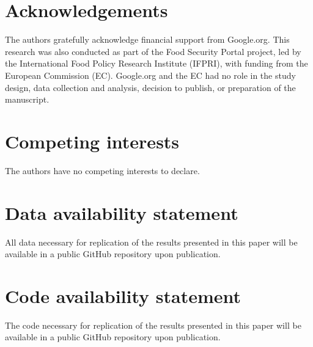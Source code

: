 \documentclass[pdflatex,sn-mathphys-num]{sn-jnl}%
\theoremstyle{thmstyleone}%
\theoremstyle{thmstyletwo}%
\theoremstyle{thmstylethree}%
\begin{document}
\section*{Acknowledgements}
The authors gratefully acknowledge financial support from Google.org. This research was also conducted as part of the Food Security Portal project, led by the International Food Policy Research Institute (IFPRI), with funding from the European Commission (EC). Google.org and the EC had no role in the study design, data collection and analysis, decision to publish, or preparation of the manuscript. 

\section*{Competing interests}
The authors have no competing interests to declare. 
\section*{Data availability statement}
All data necessary for replication of the results presented in this paper will be available in a public GitHub repository upon publication.
\section*{Code availability statement}
The code necessary for replication of the results presented in this paper will be available in a public GitHub repository upon publication.
\newpage
\clearpage

\end{document}
